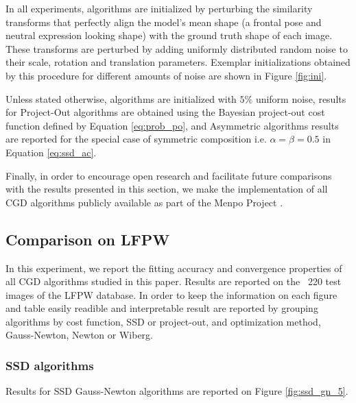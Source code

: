 In all experiments, algorithms are initialized by perturbing the similarity transforms that perfectly align the model's mean shape (a frontal pose and neutral expression looking shape) with the ground truth shape of each image. These transforms are perturbed by adding uniformly distributed random noise to their scale, rotation and translation parameters. Exemplar initializations obtained by this procedure for different amounts of noise are shown in Figure \ref{fig:ini}.

Unless stated otherwise, algorithms are initialized with $5\%$ uniform noise, results for Project-Out algorithms are obtained using the Bayesian project-out cost function defined by Equation \ref{eq:prob_po}, and Asymmetric algorithms  results are reported for the special case of symmetric composition i.e. $\alpha=\beta=0.5$ in Equation \ref{eq:ssd_ac}.

Finally, in order to encourage open research and facilitate future comparisons with the results presented in this section, we make the implementation of all CGD algorithms publicly available as part of the Menpo Project \cite{Menpo2014}.


\subsection{Comparison on LFPW}

In this experiment, we report the fitting accuracy and convergence properties of all CGD algorithms studied in this paper. Results are reported on the ~220 test images of the LFPW database. In order to keep the information on each figure and table easily readible and interpretable result are reported by grouping algorithms by cost function, SSD or project-out, and optimization method, Gauss-Newton, Newton or Wiberg.


\subsubsection{SSD algorithms}

Results for SSD Gauss-Newton algorithms are reported on Figure \ref{fig:ssd_gn_5}.

